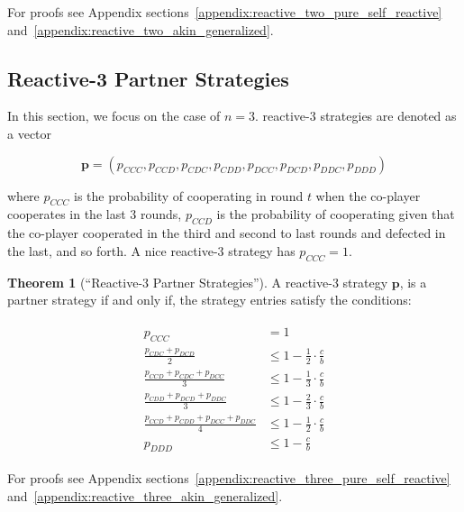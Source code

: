 \documentclass{article}
\theoremstyle{definition}
\newtheorem{theorem}{Theorem}[section]
\begin{document}
For proofs see Appendix sections~\ref{appendix:reactive_two_pure_self_reactive}
and~\ref{appendix:reactive_two_akin_generalized}.


\subsection{Reactive-3 Partner Strategies}\label{section:reactive_three_partner_strategies}

In this section, we focus on the case of $n=3$. reactive-3 strategies are
denoted as a vector 

$$\mathbf{p}=(p_{CCC}, p_{CCD}, p_{CDC}, p_{CDD}, p_{DCC}, p_{DCD}, p_{DDC}, p_{DDD})$$

where $p_{CCC}$ is the probability of cooperating in round $t$ when the
co-player cooperates in the last 3 rounds, $p_{CCD}$ is the probability of
cooperating given that the co-player cooperated in the third and second to last
rounds and defected in the last, and so forth. A nice reactive-3 strategy
has $p_{CCC} = 1$.

\begin{theorem}[``Reactive-3 Partner Strategies'']\label{theorem:reactive_three_partner_strategies}
A reactive-3 strategy $\mathbf{p}$, is a partner strategy if and only if,
the strategy entries satisfy the conditions:

\begin{align}\label{eq:three_bit_conditions}
  \begin{split}
  p_{CCC} & = 1 \\
  \frac{p_{CDC} + p_{DCD}}{2} & \leq 1 - \frac{1}{2} \cdot \frac{c}{b} \\
  \frac{p_{CCD} + p_{CDC} + p_{DCC}}{3} & \leq 1 - \frac{1}{3} \cdot \frac{c}{b} \\
  \frac{p_{CDD} + p_{DCD} + p_{DDC}}{3} & \leq 1 - \frac{2}{3} \cdot \frac{c}{b} \\
  \frac{p_{CCD} + p_{CDD} + p_{DCC} + p_{DDC}}{4}  & \leq 1 - \frac{1}{2} \cdot \frac{c}{b}  \\
  p_{DDD} & \leq 1\!-\! \frac{c}{b}
  \end{split}
\end{align}
\end{theorem}

For proofs see Appendix sections~\ref{appendix:reactive_three_pure_self_reactive}
and~\ref{appendix:reactive_three_akin_generalized}.

\end{document}
